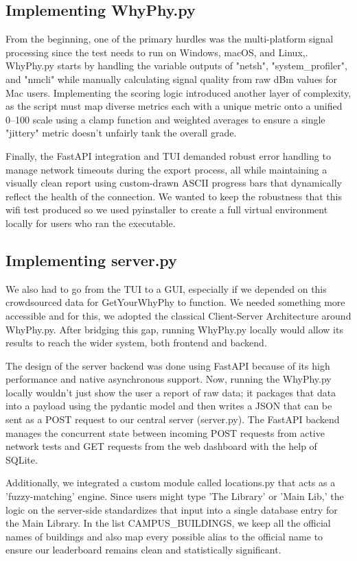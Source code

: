 \documentclass[sigconf]{acmart}
\begin{document}
\subsection{Implementing WhyPhy.py}
From the beginning, one of the primary hurdles was the multi-platform signal processing since the test needs to run on Windows, macOS, and Linux,. WhyPhy.py starts by handling the variable outputs of "netsh", "system\_profiler", and "nmcli" while manually calculating signal quality from raw dBm values for Mac users. Implementing the scoring logic introduced another layer of complexity, as the script must map diverse metrics each with a unique metric onto a unified 0–100 scale using a clamp function and weighted averages to ensure a single "jittery" metric doesn't unfairly tank the overall grade.

Finally, the FastAPI integration and TUI demanded robust error handling to manage network timeouts during the export process, all while maintaining a visually clean report using custom-drawn ASCII progress bars that dynamically reflect the health of the connection. We wanted to keep the robustness that this wifi test produced so we used pyinstaller to create a full virtual environment locally for users who ran the executable.

\subsection{Implementing server.py}
We also had to go from the TUI to a GUI, especially if we depended on this crowdsourced data for GetYourWhyPhy to function. We needed something more accessible and for this, we adopted the classical Client-Server Architecture around WhyPhy.py. After bridging this gap, running WhyPhy.py locally would allow its results to reach the wider system, both frontend and backend.

The design of the server backend was done using FastAPI because of its high performance and native asynchronous support. Now, running the WhyPhy.py locally wouldn’t just show the user a report of raw data; it packages that data into a payload using the pydantic model and then writes a JSON that can be sent as a POST request to our central server (server.py). The FastAPI backend manages the concurrent state between incoming POST requests from active network tests and GET requests from the web dashboard with the help of SQLite.

Additionally, we integrated a custom module called locations.py that acts as a 'fuzzy-matching' engine. Since users might type 'The Library' or 'Main Lib,' the logic on the server-side standardizes that input into a single database entry for the Main Library. In the list CAMPUS\_BUILDINGS, we keep all the official names of buildings and also map every possible alias to the official name to ensure our leaderboard remains clean and statistically significant.
\end{document}
